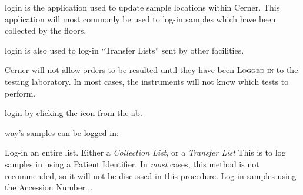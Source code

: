 
\gls{login} is the application used to update sample locations within Cerner. This application will most commonly be used to log-in samples which have been collected by the floors.

\Gls{login} is also used to log-in ``Transfer Lists'' sent by other facilities.

Cerner will not allow orders to be resulted until they have been \textsc{Logged-in} to the testing laboratory. In most cases, the instruments will not know which tests to perform.

 \gls{login} by clicking the  icon from the \gls{ab}.\\


 way's samples can be logged-in:
\begin{description}
	 Log-in an entire list. Either a \textit{Collection List}, or a \textit{Transfer List}
	 This is to log samples in using a Patient Identifier. In \textit{most} cases, this method is not recommended, so it will not be discussed in this procedure.
	 Log-in samples using the Accession Number. .
\end{description}
